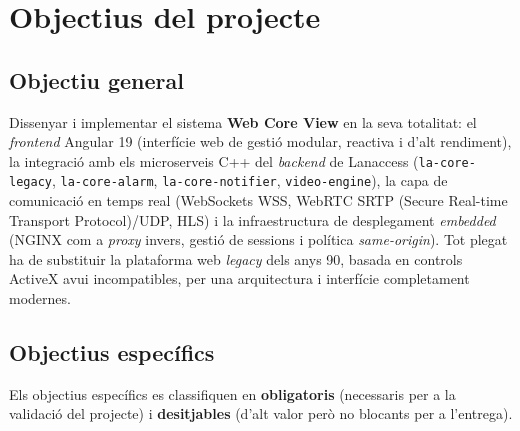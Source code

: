 \section{Objectius del projecte}
\subsection{Objectiu general}
Dissenyar i implementar el sistema \textbf{Web Core View} en la seva totalitat: el \textit{frontend} Angular 19 (interfície web de gestió modular, reactiva i d'alt rendiment), la integració amb els microserveis C++ del \textit{backend} de Lanaccess (\texttt{la-core-legacy}, \texttt{la-core-alarm}, \texttt{la-core-notifier}, \texttt{video-engine}), la capa de comunicació en temps real (WebSockets WSS, WebRTC SRTP (Secure Real-time Transport Protocol)/UDP, HLS) i la infraestructura de desplegament \textit{embedded} (NGINX com a \textit{proxy} invers, gestió de sessions i política \textit{same-origin}). Tot plegat ha de substituir la plataforma web \textit{legacy} dels anys 90, basada en controls ActiveX avui incompatibles, per una arquitectura i interfície completament modernes.

\subsection{Objectius específics}
Els objectius específics es classifiquen en \textbf{obligatoris} (necessaris per a la validació del projecte) i \textbf{desitjables} (d'alt valor però no blocants per a l'entrega).

